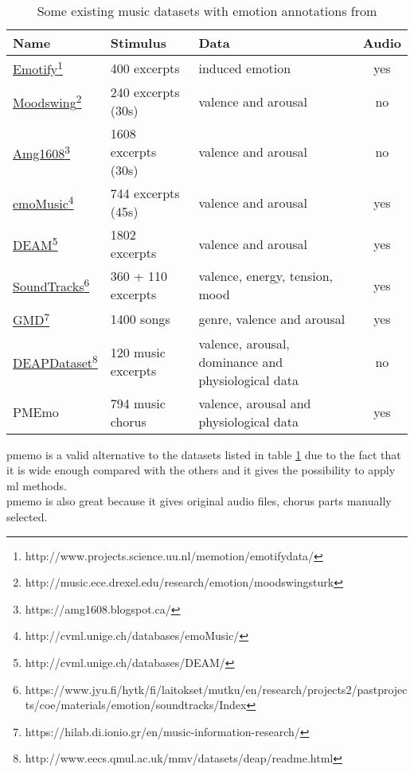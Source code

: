 \begin{savenotes}
\begin{table}[h!]
	\centering
	\begin{tabular}{|l|l|p{}|c|}
		\hline
		Name & Stimulus & Data & Audio\\ [0.5ex] 
		\hline\hline \href{http://www.projects.science.uu.nl/memotion/emotifydata/}{Emotify}\footnote{http://www.projects.science.uu.nl/memotion/emotifydata/}  & 400 excerpts & induced emotion & yes	\\ 
		\hline \href{http://music.ece.drexel.edu/research/emotion/moodswingsturk}{Moodswing}\footnote{http://music.ece.drexel.edu/research/emotion/moodswingsturk} & 240 excerpts (30s) & valence and arousal & no \\
		\hline \href{https://amg1608.blogspot.ca/}{Amg1608}\footnote{https://amg1608.blogspot.ca/} & 1608 excerpts (30s) & valence and arousal & no \\
		\hline \href{http://cvml.unige.ch/databases/emoMusic/}{emoMusic}\footnote{http://cvml.unige.ch/databases/emoMusic/} & 744 excerpts (45s) & valence and arousal & yes \\
		\hline \href{http://cvml.unige.ch/databases/DEAM/}{DEAM}\footnote{http://cvml.unige.ch/databases/DEAM/} & 1802 excerpts & valence and arousal & yes \\
		\hline \href{https://www.jyu.fi/hytk/fi/laitokset/mutku/en/research/projects2/pastprojects/coe/materials/emotion/soundtracks/Index}{SoundTracks}\footnote{https://www.jyu.fi/hytk/fi/laitokset/mutku/en/research/projects2/\newline pastprojects/coe/materials/emotion/soundtracks/Index} & 360 + 110 excerpts & valence, energy, tension, mood & yes \\
		\hline \href{https://hilab.di.ionio.gr/en/music-information-research/}{GMD}\footnote{https://hilab.di.ionio.gr/en/music-information-research/} & 1400 songs & genre, valence and arousal & yes \\
		\hline \href{http://www.eecs.qmul.ac.uk/mmv/datasets/deap/readme.html}{DEAPDataset}\footnote{http://www.eecs.qmul.ac.uk/mmv/datasets/deap/readme.html} & 120 music excerpts & valence, arousal, dominance and physiological data & no \\
		\hline PMEmo & 794 music chorus & valence, arousal and physiological data & yes \\
		\hline
	\end{tabular}
	\caption{Some existing music datasets with emotion annotations from \cite{zhang2018pmemo}}
	\label{table:datasets}
\end{table}
\end{savenotes}
\gls{pmemo} is a valid alternative to the datasets listed in table \ref{table:datasets} due to the fact that it is wide enough compared with the others and it gives the possibility to apply \gls{ml} methods.
\\
\gls{pmemo} is also great because it gives original audio files, chorus parts manually selected.

